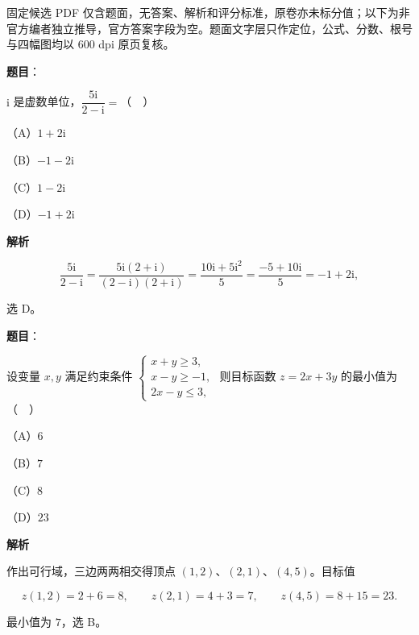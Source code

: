 

\begin{gktip}
固定候选 PDF 仅含题面，无答案、解析和评分标准，原卷亦未标分值；以下为非官方编者独立推导，官方答案字段为空。题面文字层只作定位，公式、分数、根号与四幅图均以 600 dpi 原页复核。
\end{gktip}

\begin{answer}

\textbf{题目}：

$\mathrm i$ 是虚数单位，$\dfrac{5\mathrm i}{2-\mathrm i}=$（　）

（A）$1+2\mathrm i$

（B）$-1-2\mathrm i$

（C）$1-2\mathrm i$

（D）$-1+2\mathrm i$

\textbf{解析}

\nopagebreak[4]
\[\frac{5\mathrm i}{2-\mathrm i}
=\frac{5\mathrm i(2+\mathrm i)}{(2-\mathrm i)(2+\mathrm i)}
=\frac{10\mathrm i+5\mathrm i^2}{5}
=\frac{-5+10\mathrm i}{5}=-1+2\mathrm i,\]

选 D。


\end{answer}
\begin{answer}

\textbf{题目}：

设变量 $x,y$ 满足约束条件 $\begin{cases}x+y\geqslant3,\\ x-y\geqslant-1,\\ 2x-y\leqslant3,\end{cases}$ 则目标函数 $z=2x+3y$ 的最小值为（　）

（A）$6$

（B）$7$

（C）$8$

（D）$23$

\textbf{解析}

作出可行域，三边两两相交得顶点 $(1,2)$、$(2,1)$、$(4,5)$。目标值

\nopagebreak[4]
\[z(1,2)=2+6=8,\qquad z(2,1)=4+3=7,\qquad z(4,5)=8+15=23 .\]

最小值为 $7$，选 B。


\end{answer}
